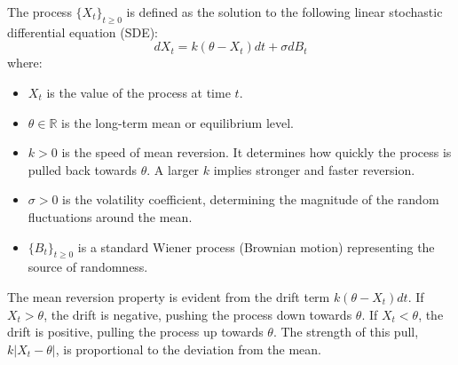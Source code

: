\documentclass[11pt,twoside,openright]{report}
\begin{document}
The process $\{X_t\}_{t \ge 0}$ is defined as the solution to the following linear stochastic differential equation (SDE):
\begin{equation}
dX_t = k (\theta - X_t) dt + \sigma dB_t
\label{eq:gaussian_ou}
\end{equation}
where:
\begin{itemize}
    \item $X_t$ is the value of the process at time $t$.
    \item $\theta \in \mathbb{R}$ is the long-term mean or equilibrium level.
    \item $k > 0$ is the speed of mean reversion. It determines how quickly the process is pulled back towards $\theta$. A larger $k$ implies stronger and faster reversion.
    \item $\sigma > 0$ is the volatility coefficient, determining the magnitude of the random fluctuations around the mean.
    \item $\{B_t\}_{t \ge 0}$ is a standard Wiener process (Brownian motion) representing the source of randomness.
\end{itemize}
The mean reversion property is evident from the drift term $k (\theta - X_t) dt$. If $X_t > \theta$, the drift is negative, pushing the process down towards $\theta$. If $X_t < \theta$, the drift is positive, pulling the process up towards $\theta$. The strength of this pull, $k |X_t - \theta|$, is proportional to the deviation from the mean.
\end{document}
